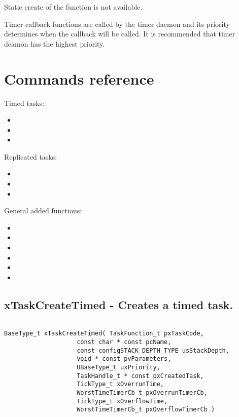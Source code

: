 Static create of the function is not available.

Timer callback functions are called by the timer daemon and its priority determines when the callback will be called. It is recommended that timer deamon has the highest priority.

\section{Commands reference}

Timed tasks:
\begin{itemize}

    \item {}
    \item {}
    \item {}
\end{itemize}

Replicated tasks:
\begin{itemize}

    \item {}
    \item {}
    \item {}
    
\end{itemize}

General added functions:
\begin{itemize}

    \item {}
    \item {}
    \item {}
    \item {}
    \item {}
    \item {}
    
\end{itemize}

\subsection{xTaskCreateTimed -  Creates a timed task.}
\label{rt_cmd:xTaskCreateTimed}

\begin{verbatim}

BaseType_t xTaskCreateTimed( TaskFunction_t pxTaskCode,
                    const char * const pcName,
                    const configSTACK_DEPTH_TYPE usStackDepth,
                    void * const pvParameters,
                    UBaseType_t uxPriority,
                    TaskHandle_t * const pxCreatedTask,
                    TickType_t xOverrunTime,
                    WorstTimeTimerCb_t pxOverrunTimerCb,
                    TickType_t xOverflowTime,
                    WorstTimeTimerCb_t pxOverflowTimerCb )
            
\end{verbatim}

